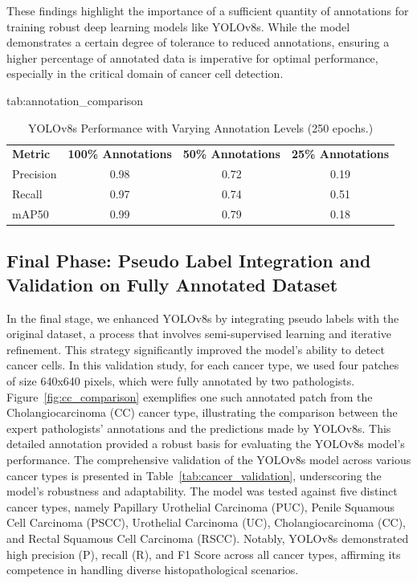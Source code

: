 \documentclass[anon]{midl} %
\begin{document}
These findings highlight the importance of a sufficient quantity of annotations for training robust deep learning models like YOLOv8s. While the model demonstrates a certain degree of tolerance to reduced annotations, ensuring a higher percentage of annotated data is imperative for optimal performance, especially in the critical domain of cancer cell detection.

\begin{table}[htbp]
\floatconts
  {tab:annotation_comparison}%
  {\caption{YOLOv8s Performance with Varying Annotation Levels (250 epochs.)}}%
  {\begin{tabular}{lccc}
  \bfseries Metric & \bfseries 100\% Annotations & \bfseries 50\% Annotations & \bfseries 25\% Annotations\\
  Precision & 0.98 & 0.72 & 0.19\\
  Recall & 0.97 & 0.74 & 0.51\\
  mAP50 & 0.99 & 0.79 & 0.18
  \end{tabular}}
\end{table}

\subsection{Final Phase: Pseudo Label Integration and Validation on Fully Annotated Dataset}
In the final stage, we enhanced YOLOv8s by integrating pseudo labels with the original dataset, a process that involves semi-supervised learning and iterative refinement. This strategy significantly improved the model's ability to detect cancer cells.  In this validation study, for each cancer type, we used four patches of size 640x640 pixels, which were fully annotated by two pathologists. Figure~\ref{fig:cc_comparison} exemplifies one such annotated patch from the Cholangiocarcinoma (CC) cancer type, illustrating the comparison between the expert pathologists' annotations and the predictions made by YOLOv8s. This detailed annotation provided a robust basis for evaluating the YOLOv8s model's performance. The comprehensive validation of the YOLOv8s model across various cancer types is  presented in Table~\ref{tab:cancer_validation}, underscoring the model's robustness and adaptability. The model was tested against five distinct cancer types, namely Papillary Urothelial Carcinoma (PUC), Penile Squamous Cell Carcinoma (PSCC), Urothelial Carcinoma (UC), Cholangiocarcinoma (CC), and Rectal Squamous Cell Carcinoma (RSCC). Notably, YOLOv8s demonstrated high precision (P), recall (R), and F1 Score across all cancer types, affirming its competence in handling diverse histopathological scenarios.
\end{document}
